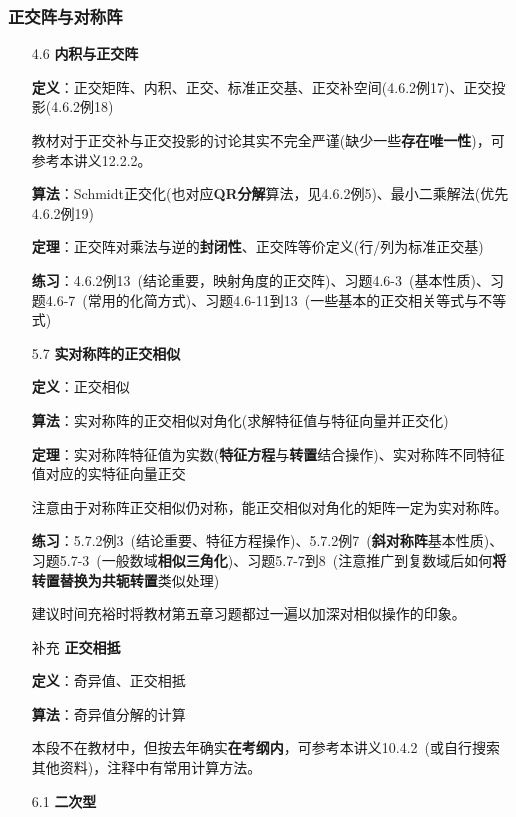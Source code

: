 \documentclass[a4paper,UTF8,fontset=windows]{ctexart}
\newcommand*{\note}{\noindent *}
\begin{document}
\subsubsection{正交阵与对称阵}
\begin{enumerate}
    \item[4.6] \textbf{内积与正交阵}
    
    \textbf{定义}：正交矩阵、内积、正交、标准正交基、正交补空间(4.6.2例17)、正交投影(4.6.2例18)

    \note 教材对于正交补与正交投影的讨论其实不完全严谨(缺少一些\textbf{存在唯一性})，可参考本讲义12.2.2。

    \textbf{算法}：Schmidt正交化(也对应\textbf{QR分解}算法，见4.6.2例5)、最小二乘解法(优先4.6.2例19)

    \textbf{定理}：正交阵对乘法与逆的\textbf{封闭性}、正交阵等价定义(行/列为标准正交基)

    \textbf{练习}：4.6.2例13\ (结论重要，映射角度的正交阵)、习题4.6-3\ (基本性质)、习题4.6-7\ (常用的化简方式)、习题4.6-11到13\ (一些基本的正交相关等式与不等式)

    \item[5.7] \textbf{实对称阵的正交相似}
    
    \textbf{定义}：正交相似
    
    \textbf{算法}：实对称阵的正交相似对角化(求解特征值与特征向量并正交化)

    \textbf{定理}：实对称阵特征值为实数(\textbf{特征方程}与\textbf{转置}结合操作)、实对称阵不同特征值对应的实特征向量正交

    \note 注意由于对称阵正交相似仍对称，能正交相似对角化的矩阵一定为实对称阵。

    \textbf{练习}：5.7.2例3\ (结论重要、特征方程操作)、5.7.2例7\ (\textbf{斜对称阵}基本性质)、习题5.7-3\ (一般数域\textbf{相似三角化})、习题5.7-7到8\ (注意推广到复数域后如何\textbf{将转置替换为共轭转置}类似处理)

    \note 建议时间充裕时将教材第五章习题都过一遍以加深对相似操作的印象。

    \item[补充] \textbf{正交相抵}
    
    \textbf{定义}：奇异值、正交相抵

    \textbf{算法}：奇异值分解的计算

    \note 本段不在教材中，但按去年确实\textbf{在考纲内}，可参考本讲义10.4.2\ (或自行搜索其他资料)，注释中有常用计算方法。

    \item[6.1] \textbf{二次型}
    

\end{enumerate}
\end{document}
